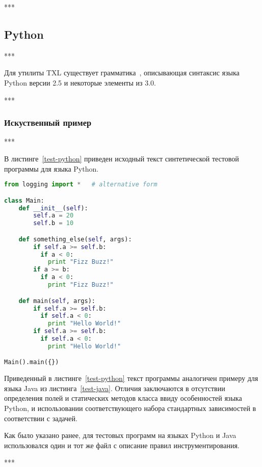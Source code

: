 ***

\subsection{Python}

***

Для утилиты TXL существует грамматика~\cite{txl-resources}, описывающая синтаксис языка Python версии 2.5 и некоторые элементы из 3.0.

***

\subsubsection{Искуственный пример}

***

В листинге~\ref{test-python} приведен исходный текст синтетической тестовой программы для языка Python.

\begin{lstlisting}[frame=single, language=Python, label={test-python}, caption={Исходный текст тестового приложения.}]
from logging import *   # alternative form

class Main:
    def __init__(self):
        self.a = 20
        self.b = 10

    def something_else(self, args):
        if self.a >= self.b:
          if a < 0:
            print "Fizz Buzz!"
        if a >= b:
          if a < 0:
            print "Fizz Buzz!"

    def main(self, args):
        if self.a >= self.b:
          if self.a < 0:
            print "Hello World!"
        if self.a >= self.b:
          if self.a < 0:
            print "Hello World!"

Main().main({})
\end{lstlisting}

Приведенный в листинге~\ref{test-python} текст программы аналогичен примеру для языка Java из листинга~\ref{test-java}.
Отличия заключаются в отсутствии определения полей и статических методов класса ввиду особенностей языка Python, и использовании соответствующего набора стандартных зависимостей в соответствии с задачей.

Как было указано ранее, для тестовых программ на языках Python и Java использовался один и тот же файл с описание правил инструментирования.

***

